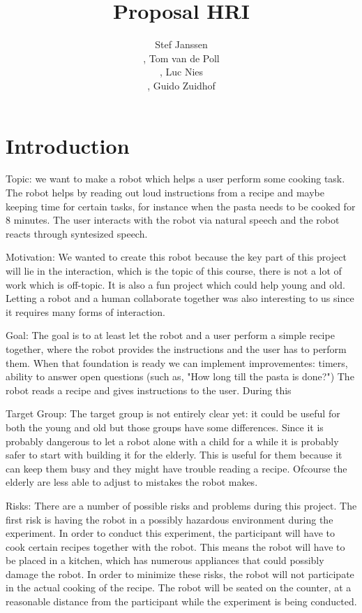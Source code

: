 \documentclass[11pt]{article} %
\title{Proposal HRI }
\author{Stef Janssen\\,
	Tom van de Poll\\,
	Luc Nies\\,
	Guido Zuidhof}
\begin{document}
\maketitle

\section{Introduction}

Topic: we want to make a robot which helps a user perform some cooking task. The robot helps by reading out loud instructions from a recipe and maybe keeping time for certain tasks, for instance when the pasta needs to be cooked for 8 minutes. The user interacts with the robot via natural speech and the robot reacts through syntesized speech.

Motivation: We wanted to create this robot because the key part of this project will lie in the interaction, which is the topic of this course, there is not a lot of work which is off-topic. It is also a fun project which could help young and old. Letting a robot and a human collaborate together was also interesting to us since it requires many forms of interaction.

Goal: The goal is to at least let the robot and a user perform a simple recipe together, where the robot provides the instructions and the user has to perform them. When that foundation is ready we can implement improvementes: timers, ability to answer open questions (such as, "How long till the pasta is done?") The robot reads a recipe and gives instructions to the user. During this 

Target Group: The target group is not entirely clear yet: it could be useful for both the young and old but those groups have some differences. Since it is probably dangerous to let a robot alone with a child for a while it is probably safer to start with building it for the elderly. This is useful for them because it can keep them busy and they might have trouble reading a recipe. Ofcourse the elderly are less able to adjust to mistakes the robot makes.

Risks: There are a number of possible risks and problems during this project. The first risk is having the robot in a possibly hazardous environment during the experiment. In order to conduct this experiment, the participant will have to cook certain recipes together with the robot. This means the robot will have to be placed in a kitchen, which has numerous appliances that could possibly damage the robot. In order to minimize these risks, the robot will not participate in the actual cooking of the recipe. The robot will be seated on the counter, at a reasonable distance from the participant while the experiment is being conducted.
\end{document}
